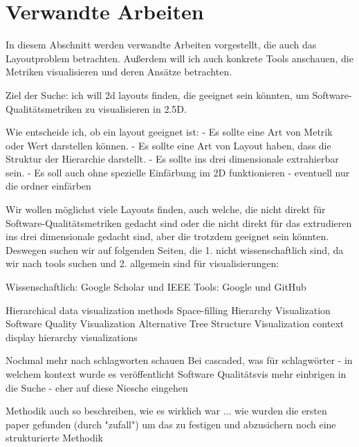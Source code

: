 \section{Verwandte Arbeiten} \label{sec:VerwandteArbeiten}
In diesem Abschnitt werden verwandte Arbeiten vorgestellt, die auch das Layoutproblem betrachten.
Außerdem will ich auch konkrete Tools anschauen, die Metriken visualisieren und deren Ansätze betrachten.


Ziel der Suche:
ich will 2d layouts finden, die geeignet sein könnten, um Software-Qualitätsmetriken zu visualisieren in 2.5D.

Wie entscheide ich, ob ein layout geeignet ist:
- Es sollte eine Art von Metrik oder Wert darstellen können.
- Es sollte eine Art von Layout haben, dass die Struktur der Hierarchie darstellt.
- Es sollte ins drei dimensionale extrahierbar sein.
- Es soll auch ohne spezielle Einfärbung im 2D funktionieren - eventuell nur die ordner einfärben

Wir wollen möglichst viele Layouts finden, auch welche, die nicht direkt für Software-Qualitätsmetriken gedacht sind oder die nicht direkt für das extrudieren ins drei dimensionale gedacht sind, aber die trotzdem geeignet sein könnten.
Deswegen suchen wir auf folgenden Seiten, die 1. nicht wissenschaftlich sind, da wir nach tools suchen und 2. allgemein sind für visualisierungen:

Wissenschaftlich:
Google Scholar und IEEE
Tools:
Google und GitHub

Hierarchical data visualization methods
Space-filling Hierarchy Visualization
Software Quality Visualization
Alternative Tree Structure Visualization
context display hierarchy visualizations


Nochmal mehr nach schlagworten schauen
Bei cascaded, was für schlagwörter - in welchem kontext wurde es veröffentlicht
Software Qualitätsvis mehr einbrigen in die Suche - eher auf diese Niesche eingehen

Methodik auch so beschreiben, wie es wirklich war ... wie wurden die ersten paper gefunden (durch "zufall") um das zu festigen und abzusichern noch eine strukturierte Methodik 

























